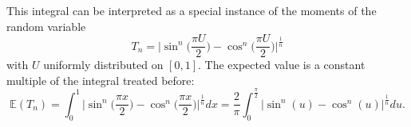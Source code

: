 \documentclass[10pt,reqno,a4paper]{amsart}%
\theoremstyle{definition}
\newcommand{\E}{\ensuremath{\mathbb{E}}} %
\begin{document}
This integral can be interpreted as a special instance of the moments of the random variable  
\[
T_n = \Big|\sin^n\big(\frac{\pi U}2 \big)-\cos^n\big(\frac{\pi U}2 \big)\Big|^{\frac1n}
\]
with $U$ uniformly distributed on $[0,1]$. The expected value is a constant multiple of the integral treated before:
\[
\E(T_n)=\int_0^{1}\Big|\sin^n\big(\frac{\pi x}2 \big)-\cos^n\big(\frac{\pi x}2 \big)\Big|^{\frac1n}dx
=\frac{2}{\pi}\int_0^{\frac{\pi}2}|\sin^n(u)-\cos^n(u)|^{\frac1n}du.
\]
\end{document}
